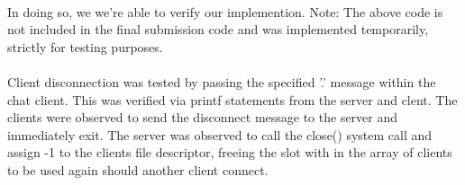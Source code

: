 \documentclass[12pt]{article}
\begin{document}
{\paragraph{} In doing so, we we're able to verify our implemention. Note: The above code is not included in the final submission code and was implemented temporarily, strictly for testing purposes.
\paragraph{} Client disconnection was tested by passing the specified '.' message within the chat client. This was verified via printf statements from the server and clent. The clients were observed to send the disconnect message to the server and immediately exit. The server was observed to call the close() system call and assign -1 to the clients file descriptor, freeing the slot with in the array of clients to be used again should another client connect. \\\\
}
\end{document}
